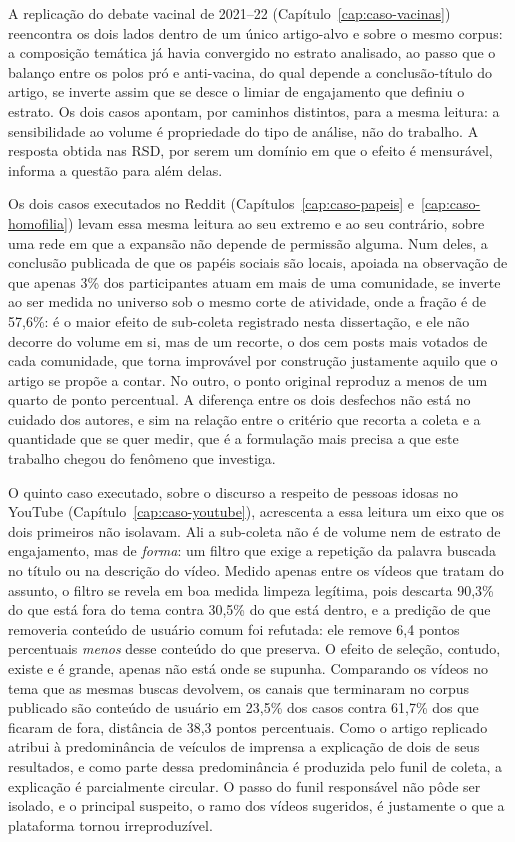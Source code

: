 A replicação do debate vacinal de 2021--22 (Capítulo~\ref{cap:caso-vacinas}) reencontra os dois
lados dentro de um único artigo-alvo e sobre o mesmo corpus: a composição temática
já havia convergido no estrato analisado, ao passo que o balanço entre os polos
pró e anti-vacina, do qual depende a conclusão-título do artigo, se inverte assim
que se desce o limiar de engajamento que definiu o estrato. Os dois casos apontam,
por caminhos distintos, para a mesma leitura: a sensibilidade ao volume é
propriedade do tipo de análise, não do trabalho. A resposta obtida nas
RSD, por serem um domínio em que o efeito é mensurável, informa a questão para
além delas.

Os dois casos executados no Reddit (Capítulos~\ref{cap:caso-papeis} e~\ref{cap:caso-homofilia}) levam essa mesma
leitura ao seu extremo e ao seu contrário, sobre uma rede em que a expansão não depende
de permissão alguma. Num deles, a conclusão publicada de que os papéis sociais são
locais, apoiada na observação de que apenas 3\% dos participantes atuam em mais de uma
comunidade, se inverte ao ser medida no universo sob o mesmo corte de atividade, onde a
fração é de 57,6\%: é o maior efeito de sub-coleta registrado nesta dissertação, e ele
não decorre do volume em si, mas de um recorte, o dos cem posts mais votados de cada
comunidade, que torna improvável por construção justamente aquilo que o artigo se propõe
a contar. No outro, o ponto original reproduz a menos de um quarto de ponto percentual.
A diferença entre os dois desfechos não está no cuidado dos autores, e sim na relação
entre o critério que recorta a coleta e a quantidade que se quer medir, que é a
formulação mais precisa a que este trabalho chegou do fenômeno que investiga.

O quinto caso executado, sobre o discurso a respeito de pessoas idosas no
YouTube (Capítulo~\ref{cap:caso-youtube}), acrescenta a essa leitura um eixo que os
dois primeiros não isolavam. Ali a sub-coleta não é de volume nem de estrato de
engajamento, mas de \emph{forma}: um filtro que exige a repetição da palavra buscada
no título ou na descrição do vídeo. Medido apenas entre os vídeos que tratam do
assunto, o filtro se revela em boa medida limpeza legítima, pois descarta 90,3\% do
que está fora do tema contra 30,5\% do que está dentro, e a predição de que removeria
conteúdo de usuário comum foi refutada: ele remove 6,4 pontos percentuais \emph{menos}
desse conteúdo do que preserva. O efeito de seleção, contudo, existe e é grande, apenas
não está onde se supunha. Comparando os vídeos no tema que as mesmas buscas devolvem,
os canais que terminaram no corpus publicado são conteúdo de usuário em 23,5\% dos
casos contra 61,7\% dos que ficaram de fora, distância de 38,3 pontos percentuais.
Como o artigo replicado atribui à predominância de veículos de imprensa a explicação de
dois de seus resultados, e como parte dessa predominância é produzida pelo funil de
coleta, a explicação é parcialmente circular. O passo do funil responsável não pôde ser
isolado, e o principal suspeito, o ramo dos vídeos sugeridos, é justamente o que a
plataforma tornou irreproduzível.

